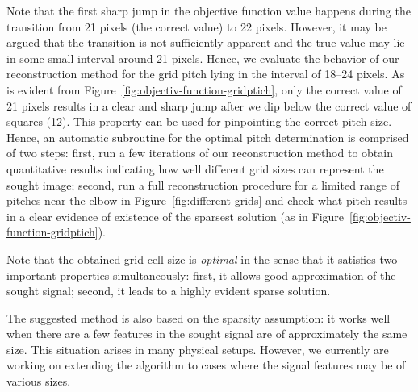 Note that the first sharp jump in the objective function value happens
during the transition from 21 pixels (the correct value) to 22
pixels. However, it may be argued that the transition is not
sufficiently apparent and the true value may lie in some small
interval around 21 pixels. Hence, we evaluate the behavior of our
reconstruction method for the grid pitch lying in the interval of
18--24 pixels. As is evident from
Figure~\ref{fig:objectiv-function-gridptich}, only the correct value
of 21 pixels results in a clear and sharp jump after we dip below
the correct value of squares (12). This property can be used for
pinpointing the correct pitch size. Hence, an automatic subroutine for
the optimal pitch determination is comprised of two steps: first, run
a few iterations of our reconstruction method to obtain quantitative
results indicating how well different grid sizes can represent the
sought image; second, run a full reconstruction procedure for a
limited range of pitches near the elbow in
Figure~\ref{fig:different-grids} and check what pitch results in a
clear evidence of existence of  the sparsest solution (as in
Figure~\ref{fig:objectiv-function-gridptich}).

Note that the obtained grid cell size is \emph{optimal}
in the sense that it satisfies two important properties
simultaneously: first, it allows good approximation of the sought
signal; second, it leads to a highly evident sparse solution.

The suggested method is also based on the sparsity assumption: it
works well when there are a few features in the sought signal are of
approximately the same size. This situation arises in many physical
setups. However, we currently are working on extending the algorithm
to cases where the signal features may be of various sizes.

